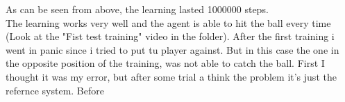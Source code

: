 \documentclass[12pt]{article}
\begin{document}
	\noindent	
	As can be seen from above, the learning lasted 1000000 steps.\\
	The learning works very well and the agent is able to hit the ball every time (Look at the "Fist test training" video in the folder).
	After the first training i went in panic since i tried to put tu player against. But in this case the one in the opposite position of the training, was not able to catch the ball. First I thought it was my error, but after some trial a think the problem it's just the refernce system. Before 
	
\end{document}
